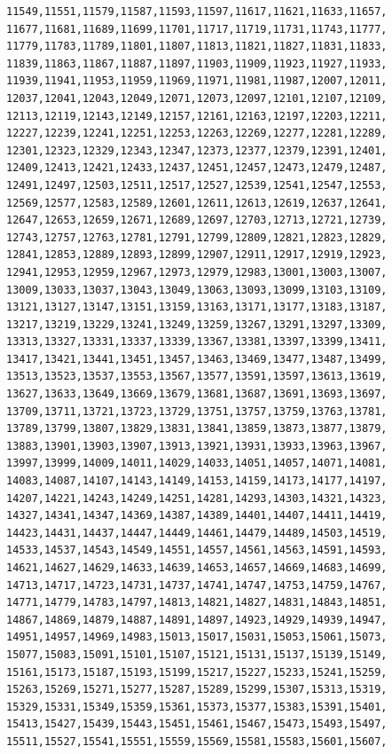 \documentclass{article}
\begin{document}
\begin{lstlisting}[caption=\texttt{maths.lib}]
11549,11551,11579,11587,11593,11597,11617,11621,11633,11657,
11677,11681,11689,11699,11701,11717,11719,11731,11743,11777,
11779,11783,11789,11801,11807,11813,11821,11827,11831,11833,
11839,11863,11867,11887,11897,11903,11909,11923,11927,11933,
11939,11941,11953,11959,11969,11971,11981,11987,12007,12011,
12037,12041,12043,12049,12071,12073,12097,12101,12107,12109,
12113,12119,12143,12149,12157,12161,12163,12197,12203,12211,
12227,12239,12241,12251,12253,12263,12269,12277,12281,12289,
12301,12323,12329,12343,12347,12373,12377,12379,12391,12401,
12409,12413,12421,12433,12437,12451,12457,12473,12479,12487,
12491,12497,12503,12511,12517,12527,12539,12541,12547,12553,
12569,12577,12583,12589,12601,12611,12613,12619,12637,12641,
12647,12653,12659,12671,12689,12697,12703,12713,12721,12739,
12743,12757,12763,12781,12791,12799,12809,12821,12823,12829,
12841,12853,12889,12893,12899,12907,12911,12917,12919,12923,
12941,12953,12959,12967,12973,12979,12983,13001,13003,13007,
13009,13033,13037,13043,13049,13063,13093,13099,13103,13109,
13121,13127,13147,13151,13159,13163,13171,13177,13183,13187,
13217,13219,13229,13241,13249,13259,13267,13291,13297,13309,
13313,13327,13331,13337,13339,13367,13381,13397,13399,13411,
13417,13421,13441,13451,13457,13463,13469,13477,13487,13499,
13513,13523,13537,13553,13567,13577,13591,13597,13613,13619,
13627,13633,13649,13669,13679,13681,13687,13691,13693,13697,
13709,13711,13721,13723,13729,13751,13757,13759,13763,13781,
13789,13799,13807,13829,13831,13841,13859,13873,13877,13879,
13883,13901,13903,13907,13913,13921,13931,13933,13963,13967,
13997,13999,14009,14011,14029,14033,14051,14057,14071,14081,
14083,14087,14107,14143,14149,14153,14159,14173,14177,14197,
14207,14221,14243,14249,14251,14281,14293,14303,14321,14323,
14327,14341,14347,14369,14387,14389,14401,14407,14411,14419,
14423,14431,14437,14447,14449,14461,14479,14489,14503,14519,
14533,14537,14543,14549,14551,14557,14561,14563,14591,14593,
14621,14627,14629,14633,14639,14653,14657,14669,14683,14699,
14713,14717,14723,14731,14737,14741,14747,14753,14759,14767,
14771,14779,14783,14797,14813,14821,14827,14831,14843,14851,
14867,14869,14879,14887,14891,14897,14923,14929,14939,14947,
14951,14957,14969,14983,15013,15017,15031,15053,15061,15073,
15077,15083,15091,15101,15107,15121,15131,15137,15139,15149,
15161,15173,15187,15193,15199,15217,15227,15233,15241,15259,
15263,15269,15271,15277,15287,15289,15299,15307,15313,15319,
15329,15331,15349,15359,15361,15373,15377,15383,15391,15401,
15413,15427,15439,15443,15451,15461,15467,15473,15493,15497,
15511,15527,15541,15551,15559,15569,15581,15583,15601,15607,

\end{lstlisting}
\end{document}
